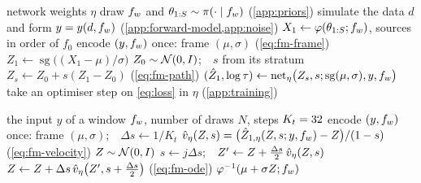 \begin{algorithm}[t]
  \caption{One training step, written for one observation; the batch holds
  \FlowMatchingWindows{} observations of \FlowMatchingDraws{} points each.}
  \label{alg:fm-train}
  \begin{algorithmic}
     network weights $\eta$
    \STATE draw $f_{w}$ and $\theta_{1:S}\sim\pi(\cdot\mid f_{w})$ (\cref{app:priors})
    \STATE simulate the data $d$ and form $y = y(d,f_{w})$ (\cref{app:forward-model,app:noise})
    \STATE $X_1\leftarrow\varphi(\theta_{1:S};f_{w})$, sources in order of $f_0$
    \STATE encode $(y,f_{w})$ once: frame $(\mu,\sigma)$ \hfill (\cref{eq:fm-frame})
    \STATE $Z_1\leftarrow\operatorname{sg}\bigl((X_1-\mu)/\sigma\bigr)$
      \STATE $Z_0\sim\mathcal{N}(0,I)$;\ \ $s$ from its stratum
      \STATE $Z_s\leftarrow Z_0 + s(Z_1 - Z_0)$ \hfill (\cref{eq:fm-path})
      \STATE $(\hat Z_1,\log\tau)\leftarrow\mathrm{net}_\eta\bigl(Z_s, s; \operatorname{sg}(\mu,\sigma), y, f_{w}\bigr)$
    \ENDFOR
    \STATE take an optimiser step on \cref{eq:loss} in $\eta$ (\cref{app:training})
  \end{algorithmic}
\end{algorithm}

\begin{algorithm}[t]
  \caption{Sampling the posterior of one window.}
  \label{alg:fm-sample}
  \begin{algorithmic}
     the input $y$ of a window $f_{w}$, number of draws $N$, steps $K_t=32{}$
    \STATE encode $(y,f_{w})$ once: frame $(\mu,\sigma)$;\ \ $\Delta s\leftarrow1/K_t$
    \STATE $\hat v_{\eta}(Z,s) = \bigl(\hat Z_{1,\eta}(Z, s; y, f_{w}) - Z\bigr)/(1-s)$ \hfill (\cref{eq:fm-velocity})
      \STATE $Z\sim\mathcal{N}(0,I)$
        \STATE $s\leftarrow j\Delta s$;\ \ $Z'\leftarrow Z + \tfrac{\Delta s}{2}\,\hat v_{\eta}(Z, s)$
        \STATE $Z\leftarrow Z + \Delta s\,\hat v_{\eta}\bigl(Z', s+\tfrac{\Delta s}{2}\bigr)$ \hfill (\cref{eq:fm-ode})
      \ENDFOR
       $\varphi^{-1}(\mu + \sigma Z;f_{w})$
    \ENDFOR
  \end{algorithmic}
\end{algorithm}
